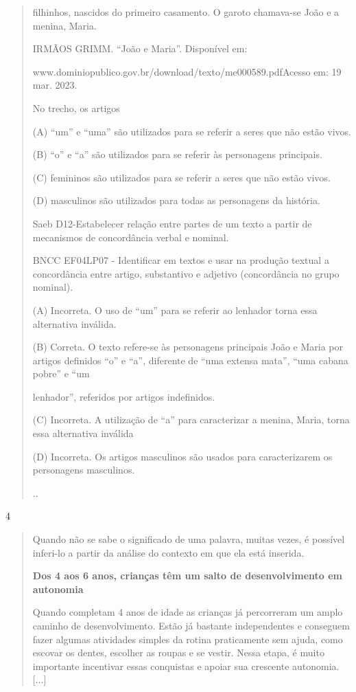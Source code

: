 \begin{itemize}
{{{\begin{itemize}
\begin{itemize}
\begin{itemize}
\begin{quote}
filhinhos, nascidos do primeiro casamento. O garoto chamava-se João e a
menina, Maria.

IRMÃOS GRIMM. ``João e Maria''. Disponível em:

www.dominiopublico.gov.br/download/texto/me000589.pdfAcesso em: 19 mar.
2023.

No trecho, os artigos

(A) ``um'' e ``uma'' são utilizados para se referir a seres que não
estão vivos.

(B) ``o'' e ``a'' são utilizados para se referir às personagens
principais.

(C) femininos são utilizados para se referir a seres que não estão
vivos.

(D) masculinos são utilizados para todas as personagens da história.

Saeb D12-Estabelecer relação entre partes de um texto a partir de
mecanismos de concordância verbal e nominal.

BNCC EF04LP07 - Identificar em textos e usar na produção textual a
concordância entre artigo, substantivo e adjetivo (concordância no grupo
nominal).

(A) Incorreta. O uso de ``um'' para se referir ao lenhador torna essa
alternativa inválida.

(B) Correta. O texto refere-se às personagens principais João e Maria
por artigos definidos ``o'' e ``a'', diferente de ``uma extensa mata'',
``uma cabana pobre'' e ``um

lenhador'', referidos por artigos indefinidos.

(C) Incorreta. A utilização de ``a'' para caracterizar a menina, Maria,
torna essa alternativa inválida

(D) Incorreta. Os artigos masculinos são usados para caracterizarem os
personagens masculinos.

..
\end{quote}

\num{4}

\begin{quote}
Quando não se sabe o significado de uma palavra, muitas vezes, é
possível inferi-lo a partir da análise do contexto em que ela está
inserida.

\textbf{Dos 4 aos 6 anos, crianças têm um salto de desenvolvimento em
autonomia}

Quando completam 4 anos de idade as crianças já percorreram um amplo
caminho de desenvolvimento. Estão já bastante independentes e conseguem
fazer algumas atividades simples da rotina praticamente sem ajuda, como
escovar os dentes, escolher as roupas e se vestir. Nessa etapa, é muito
importante incentivar essas conquistas e apoiar sua crescente autonomia.
{[}...{]}


\end{quote}
\end{itemize}
\end{itemize}
\end{itemize}}}}
\end{itemize}
